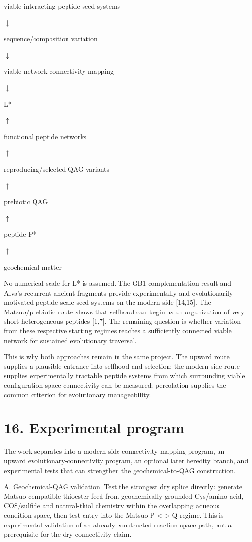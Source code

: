 \documentclass[11pt]{article}
\begin{document}
viable interacting peptide seed systems

$\downarrow$

sequence/composition variation

$\downarrow$

viable-network connectivity mapping

$\downarrow$

L*

$\uparrow$

functional peptide networks

$\uparrow$

reproducing/selected QAG variants

$\uparrow$

prebiotic QAG

$\uparrow$

peptide P*

$\uparrow$

geochemical matter

No numerical scale for L* is assumed. The GB1 complementation result and Alva's recurrent ancient fragments provide experimentally and evolutionarily motivated peptide-scale seed systems on the modern side {[}14,15{]}. The Matsuo/prebiotic route shows that selfhood can begin as an organization of very short heterogeneous peptides {[}1,7{]}. The remaining question is whether variation from these respective starting regimes reaches a sufficiently connected viable network for sustained evolutionary traversal.

This is why both approaches remain in the same project. The upward route supplies a plausible entrance into selfhood and selection; the modern-side route supplies experimentally tractable peptide systems from which surrounding viable configuration-space connectivity can be measured; percolation supplies the common criterion for evolutionary manageability.

\hypertarget{experimental-program}{%
\section*{16. Experimental program}\label{experimental-program}}

The work separates into a modern-side connectivity-mapping program, an upward evolutionary-connectivity program, an optional later heredity branch, and experimental tests that can strengthen the geochemical-to-QAG construction.

A. Geochemical-QAG validation. Test the strongest dry splice directly: generate Matsuo-compatible thioester feed from geochemically grounded Cys/amino-acid, COS/sulfide and natural-thiol chemistry within the overlapping aqueous condition space, then test entry into the Matsuo P \textless-\textgreater{} Q regime. This is experimental validation of an already constructed reaction-space path, not a prerequisite for the dry connectivity claim.
\end{document}
